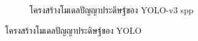 \begin{figure}[!ht]
\begin{subfigure}[b]{0.5\textwidth}
	 \caption{โครงสร้างโมเดลปัญญาประดิษฐ์ของ YOLO-v3 spp}
       \label{fig:spp}
    \end{subfigure}
    \caption{โครงสร้างโมเดลปัญญาประดิษฐ์ของ YOLO}
    \label{fig:yolo-architecture}
\end{figure}

